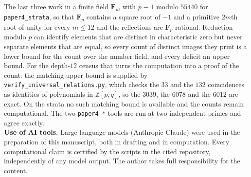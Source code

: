 \documentclass[11pt]{article}
\theoremstyle{definition}
\theoremstyle{remark}
\newcommand{\Z}{\mathbb{Z}}
\begin{document}
The last three work in a finite field $\mathbf F_p$, with $p\equiv1$ modulo
$55440$ for \texttt{paper4\_strata}, so that $\mathbf F_p$ contains a square
root of $-1$ and a primitive $2m$th root of unity for every $m\le12$ and the
reflections are $\mathbf F_p$-rational. Reduction modulo $p$ can identify elements that are
distinct in characteristic zero but never separate elements that are equal, so
every count of distinct images they print is a lower bound for the count over
the number field, and every deficit an upper bound. For the depth-$12$ census
that turns the computation into a proof of the count: the matching upper bound
is supplied by \texttt{verify\_universal\_relations.py}, which checks the $33$
and the $132$ coincidences as identities of polynomials in $\Z[p,q]$, so the
$3039$, the $6078$ and the $6012$ are exact. On the strata no such matching
bound is available and the counts remain computational. The two
\texttt{paper4\_*} tools are run at two independent primes and agree exactly.
\smallskip\\
\noindent\textbf{Use of AI tools.} Large language models (Anthropic Claude) were
used in the preparation of this manuscript, both in drafting and in computation.
Every computational claim is certified by the scripts in the cited repository,
independently of any model output. The author takes full responsibility for the
content.
\end{document}

